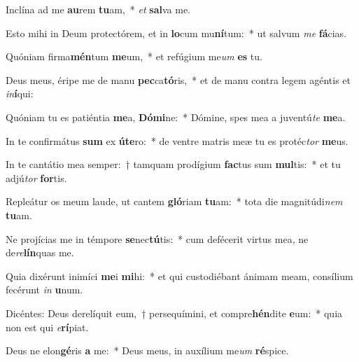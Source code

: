 \item Inclína ad me \textbf{au}rem \textbf{tu}am,~* \textit{et} \textbf{sal}va me.
\item Esto mihi in Deum protectórem, et in \textbf{lo}cum mu\textbf{ní}tum:~* ut salvum \textit{me} \textbf{fá}cias.
\item Quóniam firma\textbf{mén}tum \textbf{me}um,~* et refúgium me\textit{um} \textbf{es} tu.
\item Deus meus, éripe me de manu \textbf{pec}ca\textbf{tó}ris,~* et de manu contra legem agéntis et \textit{in}\textbf{í}qui:
\item Quóniam tu es patiéntia \textbf{me}a, \textbf{Dó}\textbf{mi}ne:~* Dómine, spes mea a juventú\textit{te} \textbf{me}a.
\item In te confirmátus \textbf{sum} ex \textbf{ú}\textbf{te}ro:~* de ventre matris meæ tu es protéc\textit{tor} \textbf{me}us.
\item In te cantátio mea semper:~† tamquam prodígium \textbf{fac}tus sum \textbf{mul}tis:~* et tu adjú\textit{tor} \textbf{for}tis.
\item Repleátur os meum laude, ut cantem \textbf{gló}riam \textbf{tu}am:~* tota die magnitúdi\textit{nem} \textbf{tu}am.
\item Ne projícias me in témpore \textbf{se}nec\textbf{tú}tis:~* cum defécerit virtus mea, ne de\textit{re}\textbf{lín}quas me.
\item Quia dixérunt inimíci \textbf{me}i \textbf{mi}hi:~* et qui custodiébant ánimam meam, consílium fecérunt \textit{in} \textbf{u}num.
\item Dicéntes: Deus derelíquit eum,~† persequímini, et compre\textbf{hén}dite \textbf{e}um:~* quia non est qui \textit{e}\textbf{rí}piat.
\item Deus ne elon\textbf{gé}ris \textbf{a} me:~* Deus meus, in auxílium me\textit{um} \textbf{ré}spice.
